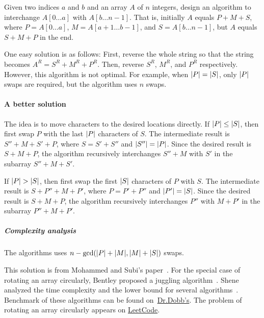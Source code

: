 \begin{Exercise}[title=Block interchange]
Given two indices $a$ and $b$ and an array $A$ of $n$ integers, design an algorithm to interchange $A[0 \dots a]$ with $A[b \dots n - 1]$.
That is, initially $A$ equals $P + M + S$, where $P = A[0 \dots a]$, $M = A[a+1 \dots b-1]$, and $S = A[b \dots n - 1]$, but $A$ equals $S + M + P$ in the end.
\end{Exercise}
\begin{Answer}
One easy solution is as follows:
First, reverse the whole string so that the string becomes $A^R = S^R + M^R + P^R$.
Then, reverse $S^R$, $M^R$, and $P^R$ respectively.
However, this algorithm is not optimal.
For example, when $\lvert P\rvert = \lvert S\rvert$, only $\lvert P\rvert$ swaps are required, but the algorithm uses $n$ swaps.

\paragraph{A better solution}  The idea is to move characters to the desired locations directly.
If $\lvert P\rvert \leq \lvert S\rvert$, then first swap $P$ with the last $\lvert P\rvert$ characters of $S$.
The intermediate result is $S'' + M + S' + P$, where $S = S' + S''$ and $\lvert S''\rvert = \lvert P\rvert$. 
Since the desired result is $S + M + P$, the algorithm recursively interchanges $S'' + M$ with $S'$ in the subarray $S'' + M + S'$.

If $\lvert P\rvert > \lvert S\rvert$, then first swap the first $\lvert S\rvert$ characters of $P$ with $S$.
The intermediate result is $S + P'' + M + P'$, where $P = P' + P''$ and $\lvert P'\rvert = \lvert S\rvert$. 
Since the desired result is $S + M + P$, the algorithm recursively interchanges $P''$ with $M + P'$ in the subarray $P'' + M + P'$.

\subparagraph{Complexity analysis} The algorithms uses $n - \text{gcd}(\lvert P\rvert + \lvert M\rvert, \lvert M\rvert + \lvert S\rvert)$ swaps.
\begin{remark}
This solution is from Mohammed and Subi's paper~\cite{Mohammed1987}. 
For the special case of rotating an array circularly, Bentley proposed a juggling algorithm~\cite{Bentley1999}.
Shene analyzed the time complexity and the lower bound for several algorithms~\cite{Shene1997}.
Benchmark of these algorithms can be found on~\href{http://www.drdobbs.com/parallel/benchmarking-block-swapping-algorithms/232900395}{Dr.Dobb's}.
The problem of rotating an array circularly appears on \href{https://leetcode.com/problems/rotate-array/}{LeetCode}.
\end{remark}
\end{Answer}

